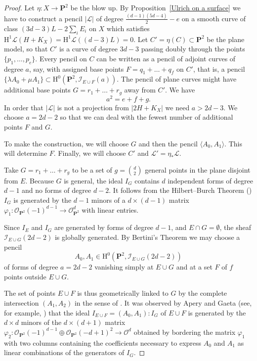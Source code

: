 \documentclass{jams-l}
\theoremstyle{definition}
\theoremstyle{remark}
\newcommand{\Hrm}{{\mathrm H}}
\newcommand{\cI}{{\mathcal I}}
\newcommand{\cL}{{\mathcal L}}
\newcommand{\Lcal}{{\mathcal L}}
\newcommand{\cO}{{\mathcal O}}
\newcommand{\PP}{{\mathbf P}}
\begin{document}
\begin{proof} 
Let $\eta : X \to \PP^2$ be the blow up. By Proposition~\ref{Ulrich on a surface}
we have to construct a pencil $|\cL|$ of degree $\frac{(d-1)(5d-4)}{2} - e$ 
on a smooth curve of class $(3d-3)L-2\sum_iE_i$ on $X$ which 
satisfies $\Hrm^1 \cL(H+K_X)=\Hrm^1\cL((d-3)L)=0$.
Let $C'=\eta(C) \subset \PP^2$ be the plane model, so
that $C'$ is a curve of degree $3d-3$ passing doubly through the 
points $\{p_1,\dots,p_e\}$. Every pencil on $C$ 
can be written as a pencil of adjoint curves of degree $a$, say, with assigned
base points $F=q_1+\ldots+q_f$ on $C'$, that is,
a pencil $\{\lambda A_0+\mu A_1\} \subset \Hrm^0(\PP^2 ,\cI_{E\cup F}(a))$.
The pencil of plane curves might have additional base points
$G=r_1+\ldots+r_g$ away from $C'$. We have
\[ a^2= e + f +g. \]
In order that $|\cL|$ is not a projection from $|2H+K_X|$ we need $a>2d-3$.
We choose $a=2d-2$ so that we can deal with the fewest number of 
additional points $F$ and $G$.

To make the construction, we will choose $G$
and then the pencil $\langle A_0,A_1\rangle$.
This will determine $F$. Finally,
we will choose $C'$ and $\Lcal'=\eta_* \Lcal$.

Take  $G=r_1+\ldots +r_g$ to be a set of $g= { d \choose 2}$
general points in the plane disjoint from $E$. 
Because $G$ is general, the ideal $I_G$ contains
$d$ independent forms of degree $d-1$ and no forms
of degree $d-2$. It follows from the 
Hilbert--Burch Theorem 
(\cite[20.4]{Eisenbud 1995}) $I_G$ is 
generated by the 
$d-1$ minors of a $d \times (d-1)$ matrix 
$\varphi_1: \cO_{\PP^2}(-1)^{d-1} \to \cO_{\PP^2}^d$ 
with linear entries. 

Since $I_E$ and $I_G$ are generated by forms of
degree $d-1$, and $E\cap G=\emptyset$,
 the sheaf $\cI_{E\cup G}(2d-2)$ is globally generated.
By Bertini's Theorem we may
choose a pencil
\[
A_0,A_1 \in \Hrm^0(\PP^2,\cI_{E\cup G} (2d-2))
\]
of forms of degree $a=2d-2$
vanishing simply at $E\cup G$ and at a set $F$ of $f$ points outside
$E\cup G$.

The set of points $E\cup F$ is thus geometrically
linked to $G$ by the complete intersection $(A_1,A_2)$
in the sense of \cite{Peskine and Szpiro 1974}. It was observed by
Apery and Gaeta
(see, for example, \cite[Proposition 21.24]{Eisenbud 1995}) that
the ideal $I_{E\cup F}=(A_0,A_1):I_G$ of $E\cup F$ 
is generated by
the $d\times d$ minors of the $ d \times (d+1)$ matrix 
$\varphi_2: \cO_{\PP^2}(-1)^{d-1}\oplus \cO_{\PP^2}(-d+1)^2 \to \cO^d$
obtained by bordering the matrix $\varphi_1$ 
with two columns containing the coefficients necessary
to express $A_0$ and $A_1$ as linear 
combinations of the 
generators of $I_G$.


\end{proof}
\end{document}
